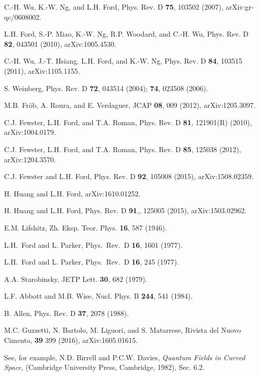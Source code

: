 \documentclass[preprint,prd,showpacs,superscriptaddress]{revtex4}
\begin{document}
\begin{thebibliography}{99}


 C.-H. Wu, K.-W. Ng, and L.H. Ford,  Phys. Rev. D
{\bf 75}, 103502 (2007), arXiv:gr-qc/0608002.

 L.H. Ford, S.-P. Miao, K.-W. Ng, R.P. Woodard, and C.-H. Wu,
 Phys. Rev. D {\bf 82}, 043501 (2010), arXiv:1005.4530.

 C.-H. Wu, J.-T. Hsiang, L.H. Ford, and K.-W. Ng,  Phys. Rev. D {\bf 84}, 103515
(2011),  arXiv:1105.1155.

 S. Weinberg, Phys. Rev. D {\bf 72}, 043514 (2004); {\bf 74}, 023508 (2006).


 M.B. Fr{\"o}b, A. Roura, and E. Verdaguer, JCAP {\bf 08}, 009 (2012), 
arXiv:1205.3097.


  C.J. Fewster, L.H. Ford, and T.A. Roman,  Phys. Rev. D {\bf 81},
121901(R) (2010),  arXiv:1004.0179.

  C.J. Fewster, L.H. Ford, and T.A. Roman, Phys. Rev. D {\bf 85},
125038 (2012),  arXiv:1204.3570.

  C.J. Fewster and L.H. Ford,  Phys. Rev. D {\bf 92},
105008 (2015),  arXiv:1508.02359. 

  H. Huang and L.H. Ford, arXiv:1610.01252.

  H. Huang and L.H. Ford, Phys. Rev. D  {\bf 91},, 125005 (2015),
arXiv:1503.02962.
 
 E.M. Lifshitz, Zh. Eksp. Teor. Phys. {\bf 16}, 587
  (1946).
  
  L.H.~Ford and L. Parker,
  Phys.\ Rev.\  D {\bf 16}, 1601 (1977).

 L.H.~Ford and L. Parker,   Phys.\ Rev.\  D {\bf 16}, 245 (1977).

 A.A. Starobinsky, JETP Lett. {\bf 30}, 682 (1979).

 L.F. Abbott and M.B. Wise, Nucl. Phys. B {\bf 244}, 541 (1984).

 B. Allen, Phys. Rev. D {\bf 37}, 2078 (1988).

 M.C. Guzzetti, N. Bartolo, M. Liguori, and S. Matarrese,
Rivista del Nuovo Cimento, {\bf 39} 399 (2016), arXiv:1605.01615.


 See, for example, N.D. Birrell and P.C.W. Davies,   {\it  Quantum Fields in Curved Space},
(Cambridge University Press, Cambridge, 1982), Sec. 6.2.


\end{thebibliography}
\end{document}
